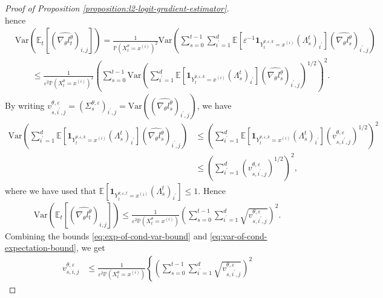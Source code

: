 \documentclass[11pt]{article}
\numberwithin{equation}{section}
\theoremstyle{definition}
\theoremstyle{remark}
\def\eps{\varepsilon}
\def\E{{\bf E}} \def\H{{\bf H}} \def\J{{\bf J}}
\def\var{{\mathrm{Var}}}
\def\bf{{\textbf{f}}}
\def\E{{\mathbb{E}}}
\begin{document}
\begin{proof}[Proof of Proposition \ref{proposition:l2-logit-gradient-estimator}]
\[\]
hence
\[
\begin{aligned}
    &\var \left( \mathbb E_t  \left[ \left(\widehat{\nabla_\theta l_t^\theta}\right)_{i,j} \right] \right)
    = \frac{1}{\mathbb P \left(X_t^\theta = x^{(i)} \right)^2} \var \left( 
    \sum_{s=0}^{t-1}  \sum_{i^\prime = 1}^d \E \left[ \eps^{-1} \mathbf 1_{Y_t^{\theta, \eps, k} = x^{(i)}} \left(\Lambda_s^t\right)_{i^\prime}\right] \left( \widehat{\nabla_\theta l_s^\theta} \right)_{i^\prime, j} 
    \right) \\
    & \qquad \leq  \frac{1}{\eps^2\mathbb P \left(X_t^\theta = x^{(i)} \right)^2}\left(\sum_{s = 0}^{t-1} \var \left( \sum_{i^\prime = 1}^d \E \left[ \mathbf 1_{Y_t^{\theta, \eps, k} = x^{(i)}} \left(\Lambda_s^t\right)_{i^\prime}\right] \left( \widehat{\nabla_\theta l_s^\theta} \right)_{i^\prime, j}  \right)^{1/2}\right)^2.
\end{aligned}
\]
By writing $v^{\theta, \eps}_{s, i^\prime,j} = (\Sigma_s^{\theta, \eps})_{i^\prime, j}=\var ( (\widehat{\nabla_\theta l_s^\theta})_{i^\prime,j})$, we have
\[
\begin{aligned}
\var \left( \sum_{i^\prime = 1}^d \E \left[ \mathbf 1_{Y_t^{\theta, \eps, k} = x^{(i)}} \left(\Lambda_s^t\right)_{i^\prime}\right] \left( \widehat{\nabla_\theta l_s^\theta} \right)_{i^\prime, j}  \right) 
&\leq \left( \sum_{i^\prime = 1}^d \E \left[ \mathbf 1_{Y_t^{\theta, \eps, k} = x^{(i)}} \left(\Lambda_s^t\right)_{i^\prime}\right] \left(v_{s,i^\prime,j}^{\theta, \eps}\right)^{1/2} \right)^2 \\
&\leq \left( \sum_{i^\prime = 1}^d  \left(v_{s,i^\prime,j}^{\theta, \eps}\right)^{1/2} \right)^2,
\end{aligned}
\]
where we have used that $\mathbb E [ \mathbf 1_{Y_t^{\theta, \eps, t} = x^{(i)}}\left(\Lambda_s^t\right)_{i^\prime} ] \leq 1$.
Hence
\begin{equation}
\label{eq:var-of-cond-expectation-bound}
\begin{aligned}
    \var \left( \mathbb E_t  \left[ \left(\widehat{\nabla_\theta l_t^\theta}\right)_{i,j} \right] \right) 
    \leq \frac{1}{\eps^2\mathbb P \left(X_t^\theta = x^{(i)} \right)}\left( \sum_{s = 0}^{t-1}\sum_{i^\prime = 1}^d \sqrt{v^{\theta, \eps}_{s, i^\prime, j}} \right)^2.
\end{aligned}
\end{equation}
Combining the bounds \eqref{eq:exp-of-cond-var-bound} and \eqref{eq:var-of-cond-expectation-bound}, we get
\[
\begin{aligned}
    v^{\theta, \eps}_{s, i, j}
    &\leq  \frac{1}{\eps^2\mathbb P \left(X_t^\theta = x^{(i)} \right)} \left\{\left( \sum_{s = 0}^{t-1}\sum_{i^\prime = 1}^d \sqrt{v^{\theta, \eps}_{s, i^\prime, j}} \right)^2

\end{aligned}\]
\end{proof}
\end{document}
